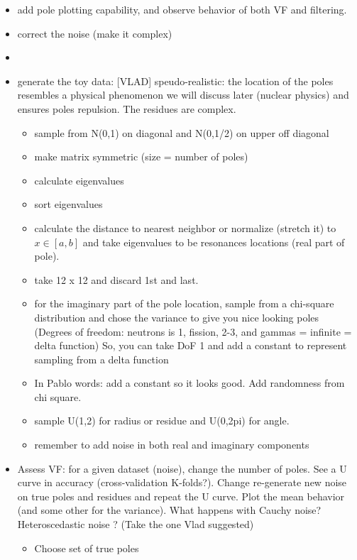 \documentclass{article}
\begin{document}
\begin{itemize}
    \item add pole plotting capability, and observe behavior of both VF and filtering.
    \item correct the noise (make it complex)
    \item 
    \item generate the toy data: [VLAD] speudo-realistic: the location of the poles resembles a physical phenomenon we will discuss later (nuclear physics) and ensures poles repulsion. The residues are complex. 
    \begin{itemize}
        \item sample from N(0,1) on diagonal and N(0,1/2) on upper off diagonal
        \item make matrix symmetric (size = number of poles)
        \item calculate eigenvalues
        \item sort eigenvalues
        \item calculate the distance to nearest neighbor or normalize (stretch it) to $x \in [a,b]$ and take eigenvalues to be resonances locations (real part of pole).
        \item take 12 x 12 and discard 1st and last. 
        \item for the imaginary part of the pole location, sample from a chi-square distribution and chose the variance to give you nice looking poles (Degrees of freedom: neutrons is 1, fission, 2-3, and gammas = infinite = delta function) So, you can take DoF 1 and add a constant to represent sampling from a delta function
        \item In Pablo words: add a constant so it looks good. Add randomness from chi square. 
        \item sample U(1,2) for radius or residue and U(0,2pi) for angle.
        \item remember to add noise in both real and imaginary components
    \end{itemize}
    \item Assess VF: for a given dataset (noise), change the number of poles. See a U curve in accuracy (cross-validation K-folds?). Change re-generate new noise on true poles and residues and repeat the U curve. Plot the mean behavior (and some other for the variance). What happens with Cauchy noise? Heteroscedastic noise ? (Take the one Vlad suggested)
    \begin{itemize}
        \item Choose set of true poles

\end{itemize}
\end{itemize}
\end{document}
